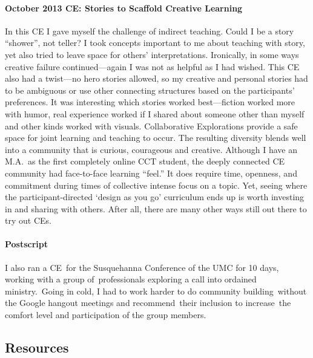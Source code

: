 \hypertarget{october-2013-ce-stories-to-scaffold-creative-learning}{%
\paragraph{October 2013 CE: Stories to Scaffold Creative
Learning}\label{october-2013-ce-stories-to-scaffold-creative-learning}}

In this CE I gave myself the challenge of indirect teaching. Could I be
a story ``shower'', not teller? I took concepts important to me about
teaching with story, yet also tried to leave space for others'
interpretations. Ironically, in some ways creative failure
continued---again I was not as helpful as I had wished. This CE also had
a twist---no hero stories allowed, so my creative and personal stories
had to be ambiguous or use other connecting structures based on the
participants' preferences. It was interesting which stories worked
best---fiction worked more with humor, real experience worked if I
shared about someone other than myself and other kinds worked with
visuals. Collaborative Explorations provide a safe space for joint
learning and teaching to occur. The resulting diversity blends well into
a community that is curious, courageous and creative. Although I have an
M.A.~as the first completely online CCT student, the deeply connected CE
community had face-to-face learning ``feel.'' It does require time,
openness, and commitment during times of collective intense focus on a
topic. Yet, seeing where the participant-directed `design as you go'
curriculum ends up is worth investing in and sharing with others. After
all, there are many other ways still out there to try out CEs.

\hypertarget{postscript}{%
\paragraph{Postscript}\label{postscript}}

I also ran a CE~for the Susquehanna Conference of the UMC for 10 days,
working with a group of~professionals exploring a call into ordained
ministry.~Going in cold, I had to work harder to do community
building~without the Google hangout meetings and recommend~their
inclusion to increase~the comfort level and participation of the group
members.

\hypertarget{resources}{%
\subsection{Resources}\label{resources}}


